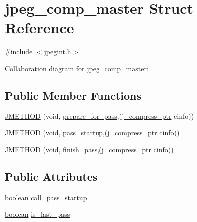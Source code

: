 \hypertarget{structjpeg__comp__master}{}\section{jpeg\+\_\+comp\+\_\+master Struct Reference}
\label{structjpeg__comp__master}


{\ttfamily \#include $<$jpegint.\+h$>$}



Collaboration diagram for jpeg\+\_\+comp\+\_\+master\+:
\subsection*{Public Member Functions}
\begin{DoxyCompactItemize}
\item 
\mbox{\hyperlink{structjpeg__comp__master_afdbee5aedaedd9c6c9837b6bfd834a63}{J\+M\+E\+T\+H\+OD}} (void, \mbox{\hyperlink{jcmaster_8c_a811c02b8de42399196fc3e0eb08c40a5}{prepare\+\_\+for\+\_\+pass}},(\mbox{\hyperlink{jpeglib_8h_add2a072c54e3a51550f4975f7ddb91e7}{j\+\_\+compress\+\_\+ptr}} cinfo))
\item 
\mbox{\hyperlink{structjpeg__comp__master_ac7e4391d1afe92c685cb4ffea5383d2c}{J\+M\+E\+T\+H\+OD}} (void, \mbox{\hyperlink{jcmaster_8c_a41d1d2da456f1cd859c69823965becbc}{pass\+\_\+startup}},(\mbox{\hyperlink{jpeglib_8h_add2a072c54e3a51550f4975f7ddb91e7}{j\+\_\+compress\+\_\+ptr}} cinfo))
\item 
\mbox{\hyperlink{structjpeg__comp__master_a81648a22581acb403aa707a5e56bf993}{J\+M\+E\+T\+H\+OD}} (void, \mbox{\hyperlink{jcarith_8c_a3098c13232c4cb8675f1f35a80aa5944}{finish\+\_\+pass}},(\mbox{\hyperlink{jpeglib_8h_add2a072c54e3a51550f4975f7ddb91e7}{j\+\_\+compress\+\_\+ptr}} cinfo))
\end{DoxyCompactItemize}
\subsection*{Public Attributes}
\begin{DoxyCompactItemize}
\item 
\mbox{\hyperlink{jmorecfg_8h_a7c6368b321bd9acd0149b030bb8275ed}{boolean}} \mbox{\hyperlink{structjpeg__comp__master_a72c70556604030b6b10d798f6c193e6f}{call\+\_\+pass\+\_\+startup}}
\item 
\mbox{\hyperlink{jmorecfg_8h_a7c6368b321bd9acd0149b030bb8275ed}{boolean}} \mbox{\hyperlink{structjpeg__comp__master_aac35b3d9e718376d1aacdde9df32e75d}{is\+\_\+last\+\_\+pass}}
\end{DoxyCompactItemize}


